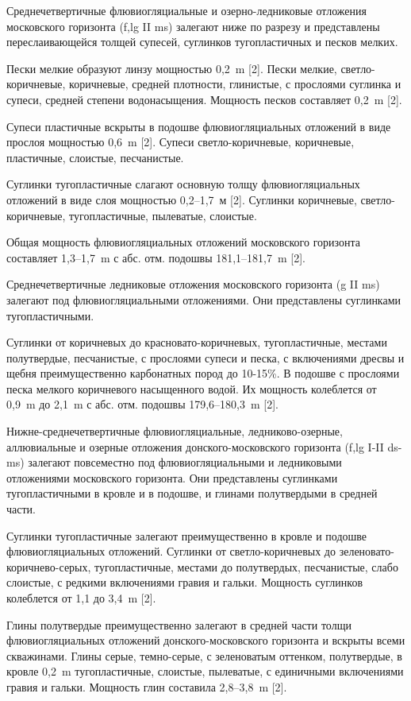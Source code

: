 Среднечетвертичные флювиогляциальные и озерно-ледниковые отложения московского горизонта (f,lg II ms) залегают ниже по разрезу и представлены переслаивающейся толщей супесей, суглинков тугопластичных и песков мелких.

Пески мелкие образуют линзу мощностью 0,2~\si{\meter} [2]. Пески мелкие, светло-коричневые, коричневые, средней плотности, глинистые, с прослоями суглинка и супеси, средней степени водонасыщения. 
Мощность песков составляет 0,2~\si{\meter} [2].

Супеси пластичные вскрыты в подошве флювиогляциальных отложений в виде прослоя мощностью 0,6~\si{\meter} [2]. 
Супеси светло-коричневые, коричневые, пластичные, слоистые, песчанистые.

Суглинки тугопластичные слагают основную толщу флювиогляциальных отложений в виде слоя мощностью 0,2--1,7~м [2]. 
Суглинки коричневые, светло-коричневые, тугопластичные, пылеватые, слоистые.

Общая мощность флювиогляциальных отложений московского горизонта составляет 1,3--1,7~\si{\meter} с абс. отм. подошвы 181,1--181,7~\si{\meter} [2].

Среднечетвертичные ледниковые отложения московского горизонта (g II ms) залегают под флювиогляциальными отложениями. 
Они представлены суглинками тугопластичными.

Суглинки от коричневых до красновато-коричневых, тугопластичные, местами полутвердые, песчанистые, с прослоями супеси и песка, с включениями дресвы и щебня преимущественно карбонатных пород до 10-15\%. В подошве с прослоями песка мелкого коричневого насыщенного водой. 
Их мощность колеблется от 0,9~\si{\meter} до 2,1~\si{\meter} с абс. отм. подошвы 179,6--180,3~\si{\meter} [2].

Нижне-среднечетвертичные флювиогляциальные, ледниково-озерные, аллювиальные и озерные отложения донского-московского горизонта (f,lg I-II ds-ms) залегают повсеместно под флювиогляциальными и ледниковыми отложениями московского горизонта. 
Они представлены суглинками тугопластичными в кровле и в подошве, и глинами полутвердыми в средней части.

Суглинки тугопластичные залегают преимущественно в кровле и подошве флювиогляциальных отложений.
Суглинки от светло-коричневых до зеленовато-коричнево-серых, тугопластичные, местами до полутвердых, песчанистые, слабо слоистые, с редкими включениями гравия и гальки. 
Мощность суглинков колеблется от 1,1 до 3,4~\si{\meter} [2].

Глины полутвердые преимущественно залегают в средней части толщи флювиогляциальных отложений донского-московского горизонта и вскрыты всеми скважинами.
Глины серые, темно-серые, с зеленоватым оттенком, полутвердые, в кровле 0,2~\si{\meter} тугопластичные, слоистые, пылеватые, с единичными включениями гравия и гальки. 
Мощность глин составила 2,8--3,8~\si{\meter} [2].

